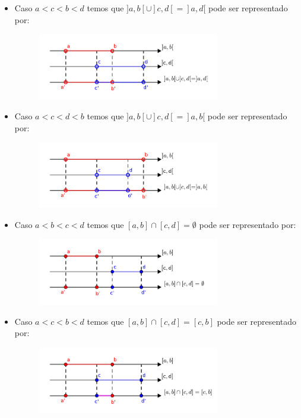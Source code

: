 \begin{itemize}
 \item Caso $a< c< b< d$ temos que $]a, b[ \cup ]c, d[= ]a, d[$ pode ser representado por:
  \begin{figure}[H]
 \centering
 \includegraphics[width=8cm]{./cap_conjnum/figs/uniao-acb-d}
 \end{figure}

   \item Caso $a< c< d< b$ temos que $]a, b[ \cup ]c, d[= ]a, b[$ pode ser representado por:
  \begin{figure}[H]
 \centering
 \includegraphics[width=8cm]{./cap_conjnum/figs/uniao-acd-b}
 \end{figure}

 \item Caso $a< b< c< d$ temos que $[a, b] \cap [c, d]= \emptyset$ pode ser representado por:
  \begin{figure}[H]
 \centering
 \includegraphics[width=8cm]{./cap_conjnum/figs/intersecaoabcd}
 \end{figure}

 \item Caso $a< c< b< d$ temos que $[a, b] \cap [c, d]= [c, b]$ pode ser representado por:
  \begin{figure}[H]
 \centering
 \includegraphics[width=8cm]{./cap_conjnum/figs/intersecaoacbd}
 \end{figure}


\end{itemize}
